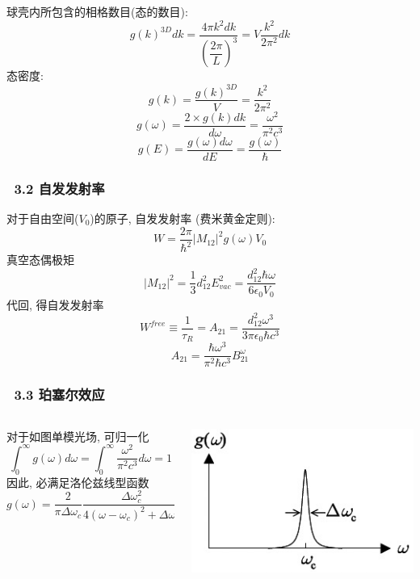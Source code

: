\begin{frame} 
    \frametitle{}
    球壳内所包含的相格数目(态的数目):
    \[ g(k)^{3D} dk = \frac{4 \pi k^2 d k}{(\dfrac{2\pi}{L})^3} = V \frac{k^2}{2\pi^2} dk\]
    态密度:
    \[ g(k) = \frac{g(k)^{3D}}{V} = \frac{k^2}{2\pi^2}\]
    \[ g(\omega) = \frac{2 \times g(k) dk }{d \omega} = \frac{\omega^2}{\pi^2 c^3}\]
    \[ g(E) = \frac{ g(\omega) d \omega }{d E} = \frac{ g(\omega) }{\hbar}\]
\end{frame}

    \begin{frame} 
    \frametitle{~3.2 自发发射率}
    对于自由空间($V_0$)的原子, 自发发射率 (费米黄金定则): 
    \[ W = \frac{2\pi}{\hbar^2} \left|M_{12}\right|^2 g(\omega) V_0\]
    真空态偶极矩 
    \[ \left|M_{12}\right|^2 =\frac{1}{3} d^2_{12} E^2_{vac} = \frac{d^2_{12} \hbar \omega}{6 \epsilon_0 V_0}\]
    代回, 得自发发射率
    \[ W^{free} \equiv \frac{1}{\tau_R} = A_{21} =  \frac{d^2_{12} \omega ^3 }{3 \pi \epsilon_0 \hbar c^3} \]
    \[ A_{21}=  \frac{ \hbar \omega ^3 }{ \pi ^2 \hbar c^3} B^\omega _{21}\]
    \end{frame}

    \begin{frame} 
    \frametitle{~3.3 珀塞尔效应}
       
           \begin{columns}
               \begin{column}[t]{0.69\linewidth}
                对于如图单模光场, 可归一化  
                \[ \int _0 ^\infty g(\omega) d \omega  = \int _0 ^\infty \frac{\omega^2}{\pi^2 c^3} d \omega =1 \]
                因此, 必满足洛伦兹线型函数 
                \[ g(\omega) = \frac{2}{\pi \Delta \omega_c}  \frac{\Delta \omega_c ^2}{4(\omega -\omega_c)^2 +\Delta \omega_c ^2} \]
               \end{column}
               \begin{column}[t]{0.3\linewidth}
                  \begin{center}
                       \includegraphics[width=1.0\textwidth]{figs/2022-05-26-12-13-25.png}
                  \end{center}
               \end{column}
           \end{columns}  
    \end{frame}

